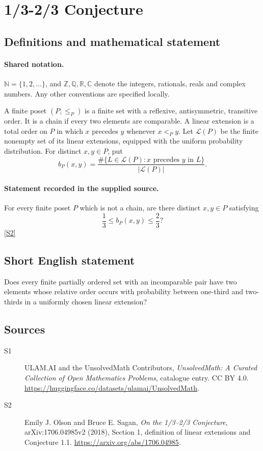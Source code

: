 \documentclass[11pt]{article}
\newcommand{\sref}[2]{\hyperlink{source:#1:#2}{[S#2]}}
\begin{document}
\section{1/3-2/3 Conjecture}\label{statement}

\subsection{Definitions and mathematical statement}

\paragraph{Shared notation.}$\mathbb N=\{1,2,\ldots\}$, and $\mathbb Z,\mathbb Q,\mathbb R,\mathbb C$ denote the integers, rationals, reals and complex numbers. Any other conventions are specified locally.


A finite poset \((P,\le_P)\) is a finite set with a reflexive,
antisymmetric, transitive order. It is a chain if every two elements
are comparable. A linear extension is a total order on \(P\) in
which \(x\) precedes \(y\) whenever \(x<_P y\).
Let \(\mathcal L(P)\) be the finite nonempty set of its linear
extensions, equipped with the uniform probability distribution.
For distinct \(x,y\in P\), put
\[
 b_P(x,y)=\frac{\#\{L\in\mathcal L(P):x\text{ precedes }y\text{ in }L\}}
                  {|\mathcal L(P)|}.
\]
\paragraph{Statement recorded in the supplied source.}
For every finite poset \(P\) which is not a chain, are there
distinct \(x,y\in P\) satisfying
\[
                 \frac13\le b_P(x,y)\le\frac23?
\] \sref{statement}{2}
\subsection{Short English statement}
Does every finite partially ordered set with an incomparable pair have two elements whose relative order occurs with probability between one-third and two-thirds in a uniformly chosen linear extension?
\subsection{Sources}
\begin{description}
\item[\hypertarget{source:statement:1}{S1}] ULAM.AI and the UnsolvedMath Contributors, \emph{UnsolvedMath: A Curated Collection of Open Mathematics Problems}, catalogue entry. CC BY 4.0. \url{https://huggingface.co/datasets/ulamai/UnsolvedMath}.
\item[\hypertarget{source:statement:2}{S2}] Emily J. Olson and Bruce E. Sagan, \emph{On the 1/3--2/3 Conjecture}, arXiv:1706.04985v2 (2018), Section 1, definition of linear extensions and Conjecture 1.1. \url{https://arxiv.org/abs/1706.04985}.
\end{description}
\label{end:statement}
\end{document}
